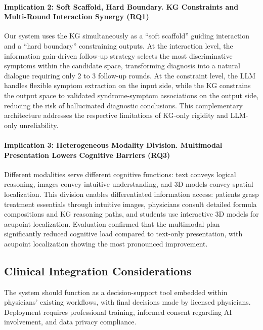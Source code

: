 \paragraph{Implication 2: Soft Scaffold, Hard Boundary. KG Constraints and Multi-Round Interaction Synergy (RQ1)}
Our system uses the KG simultaneously as a ``soft scaffold'' guiding interaction and a ``hard boundary'' constraining outputs. At the interaction level, the information gain-driven follow-up strategy selects the most discriminative symptoms within the candidate space, transforming diagnosis into a natural dialogue requiring only 2 to 3 follow-up rounds\cite{11,12}. At the constraint level, the LLM handles flexible symptom extraction on the input side, while the KG constrains the output space to validated syndrome-symptom associations on the output side, reducing the risk of hallucinated diagnostic conclusions\cite{25,64,44,45}. This complementary architecture addresses the respective limitations of KG-only rigidity and LLM-only unreliability.

\paragraph{Implication 3: Heterogeneous Modality Division. Multimodal Presentation Lowers Cognitive Barriers (RQ3)}
Different modalities serve different cognitive functions: text conveys logical reasoning, images convey intuitive understanding, and 3D models convey spatial localization\cite{67,Baxter2025}. This division enables differentiated information access: patients grasp treatment essentials through intuitive images, physicians consult detailed formula compositions and KG reasoning paths, and students use interactive 3D models for acupoint localization\cite{30,69}. Evaluation confirmed that the multimodal plan significantly reduced cognitive load compared to text-only presentation, with acupoint localization showing the most pronounced improvement.

\subsection{Clinical Integration Considerations}\label{sec:clinical-integration}

The system should function as a decision-support tool embedded within physicians' existing workflows, with final decisions made by licensed physicians. Deployment requires professional training, informed consent regarding AI involvement, and data privacy compliance\cite{7,8,14}.

